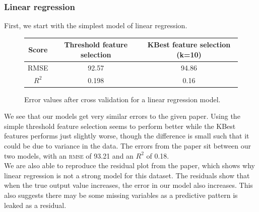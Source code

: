 \documentclass{article}
\newcommand{\n}[0]{\\[\baselineskip]}
\begin{document}
\subsubsection{Linear regression}
First, we start with the simplest model of linear regression. 
\begin{figure}[H]
\centering
\begin{tabular}{| c | c | c |}
\hline
\textbf{Score} &  \textbf{Threshold feature selection} & \textbf{KBest feature selection (k=10)} \\
\hline
RMSE & 92.57 & 94.86 \\
\hline
\textbf{$R^{2}$} & 0.198 & 0.16 \\
\hline
\end{tabular}
\caption{Error values after cross validation for a linear regression model.}
\end{figure}
\noindent
We see that our models get very similar errors to the given paper. Using the simple threshold feature selection seems to perform better while the KBest features performs just slightly worse, though the difference is small such that it could be due to variance in the data. The errors from the paper sit between our two models, with an \textsc{rmse} of 93.21 and an $R^{2}$ of 0.18. 
\n
We are also able to reproduce the residual plot from the paper, which shows why linear regression is not a strong model for this dataset. The residuals show that when the true output value increases, the error in our model also increases. This also suggests there may be some missing variables as a predictive pattern is leaked as a residual\cite{residual}.
\end{document}
